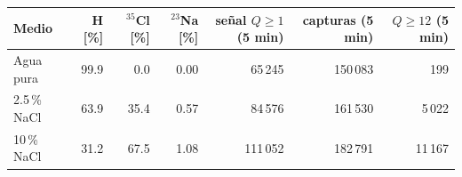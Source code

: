 \begin{tabular}{lrrrrrr}
\toprule
Medio & H [\%] & $^{35}$Cl [\%] & $^{23}$Na [\%] & señal $Q\geq1$ (5 min) & capturas (5 min) & $Q\geq12$ (5 min) \\
\midrule
Agua pura & 99.9 & 0.0 & 0.00 & 65\,245 & 150\,083 & 199 \\
2.5\,\% NaCl & 63.9 & 35.4 & 0.57 & 84\,576 & 161\,530 & 5\,022 \\
10\,\% NaCl & 31.2 & 67.5 & 1.08 & 111\,052 & 182\,791 & 11\,167 \\
\bottomrule
\end{tabular}
